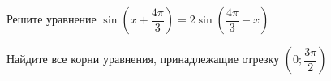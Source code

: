 \begin{ex}
	\begin{condition}
		\begin{enumcols}[label=\asbuk*)]
			\item Решите уравнение \(  \sin{\left(x +\dfrac{4\pi}{3}\right)} = 2\sin{\left(\dfrac{4\pi}{3} - x\right)} \)
			\item Найдите все корни уравнения, принадлежащие отрезку \( \left(0;\dfrac{3\pi}{2}\right) \)
		\end{enumcols}
	\end{condition}
\end{ex}